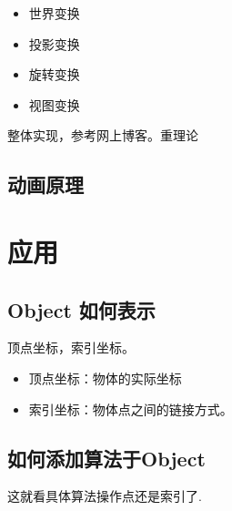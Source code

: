 \documentclass[UTF8,a4paper,12pt]{ctexart}
\begin{document}
		\begin{itemize}
			\item 世界变换
			\item 投影变换
			\item 旋转变换
			\item 视图变换
		\end{itemize}
		
		整体实现，参考网上博客。重理论
	\subsection{动画原理}

\section{应用}
	\subsection{Object 如何表示}
		顶点坐标，索引坐标。
		
		\begin{itemize}
			\item 顶点坐标：物体的实际坐标
			\item 索引坐标：物体点之间的链接方式。
		\end{itemize}
		
	\subsection{如何添加算法于Object}
		这就看具体算法操作点还是索引了.
		    
\end{document}

